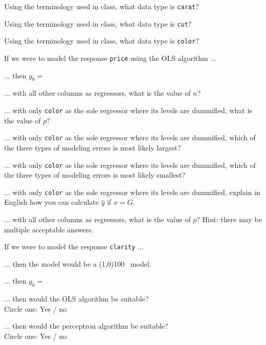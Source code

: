 \documentclass[12pt]{article}
\begin{document}
\benum

 Using the terminology used in class, what data type is \texttt{carat}? 

 Using the terminology used in class, what data type is \texttt{cut}? 

 Using the terminology used in class, what data type is \texttt{color}? 

If we were to model the response \texttt{price} using the OLS algorithm ...

 ... then $g_0 = $ 

 ... with all other columns as regressors, what is the value of $n$?  

 ...  with only \texttt{color} as the sole regressor where its levels are dummified, what is the value of $p$? 

 ...  with only \texttt{color} as the sole regressor where its levels are dummified, which of the three types of modeling errors is most likely largest? 

 ...  with only \texttt{color} as the sole regressor where its levels are dummified, which of the three types of modeling errors is most likely smallest? 

 ... with only \texttt{color} as the sole regressor where its levels are dummified, explain in English how you can calculate $\hat{y}$ if $x = G$. 

 ... with all other columns as regressors, what is the value of $p$? Hint: there may be multiple acceptable answers.  

If we were to model the response \texttt{clarity} ...

 ... then the model would be a \line(1,0){100} ~model. 

 ... then $g_0 = $ 

 ... then would the OLS algorithm be suitable? \\ Circle one: Yes / no 

 ... then would the perceptron algorithm be suitable? \\Circle one: Yes / no 
\end{document}
